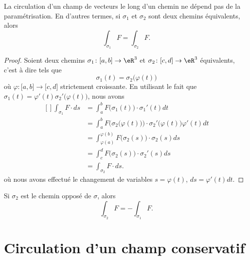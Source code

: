 \begin{proposition}
    La circulation d'un champ de vecteurs le long d'un chemin ne dépend pas de la paramétrisation. En d'autres termes, si $\sigma_1$ et $\sigma_2$ sont deux chemins équivalents, alors
    \begin{equation}
        \int_{\sigma_1}F=\int_{\sigma_2}F.
    \end{equation}
\end{proposition}

\begin{proof}
    Soient deux chemins $\sigma_1\colon \mathopen[ a , b \mathclose]\to \eR^3$ et $\sigma_2\colon \mathopen[ c , d \mathclose]\to \eR^3$ équivalents, c'est à dire tels que
    \begin{equation}
        \sigma_1(t)=\sigma_2\big( \varphi(t) \big)
    \end{equation}
    où $\varphi\colon \mathopen[ a , b \mathclose]\to \mathopen[ c , d \mathclose]$ strictement croissante. En utilisant le fait que $\sigma_1(t)=\varphi'(t)\sigma_2'\big( \varphi(t) \big)$, nous avons
    \begin{equation}
        \begin{aligned}[]
            \int_{\sigma_1}F\cdot ds&=\int_a^bF\big( \sigma_1(t) \big)\cdot\sigma_1'(t)dt\\
            &=\int_a^bF\Big( \sigma_2\big( \varphi(t) \big) \Big)\cdot\sigma_2'\big( \varphi(t) \big)\varphi'(t)dt\\
            &=\int_{\varphi(a)}^{\varphi(b)}F\big( \sigma_2(s) \big)\cdot\sigma_2(s)ds\\
            &=\int_c^dF\big( \sigma_2(s) \big)\cdot \sigma_2'(s)ds\\
            &=\int_{\sigma_2}F\cdot ds.
        \end{aligned}
    \end{equation}
    où nous avons effectué le changement de variables $s=\varphi(t)$, $ds=\varphi'(t)dt$.
\end{proof}

\begin{remark}
    Si $\sigma_2$ est le chemin opposé de $\sigma$, alors
    \begin{equation}
        \int_{\sigma_2}F=-\int_{\sigma_1}F.
    \end{equation}
\end{remark}

\section{Circulation d'un champ conservatif}

